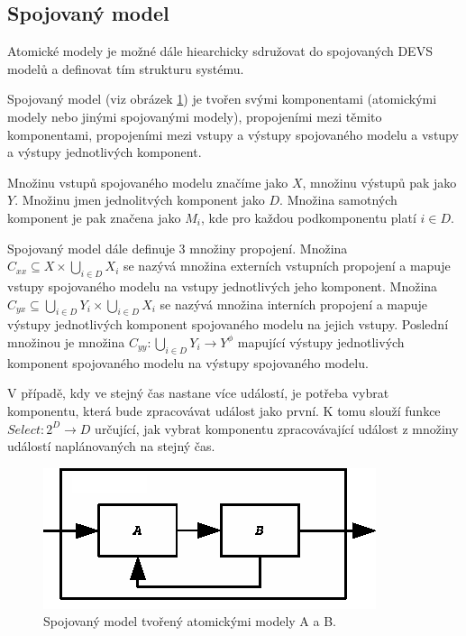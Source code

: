 \subsection{Spojovaný model}

Atomické modely je možné dále hiearchicky sdružovat do spojovaných DEVS modelů a definovat tím strukturu systému.

Spojovaný model (viz obrázek \ref{fig:coupled}) je tvořen svými komponentami (atomickými modely nebo jinými spojovanými modely), propojeními mezi těmito komponentami, propojeními mezi vstupy a výstupy spojovaného modelu a vstupy a výstupy jednotlivých komponent. 

Množinu vstupů spojovaného modelu značíme jako $X$, množinu výstupů pak jako $Y$. Množinu jmen jednolitvých komponent jako $D$. Množina samotných komponent je pak značena jako $M_i$, kde pro každou podkomponentu platí $i \in D$.

Spojovaný model dále definuje 3 množiny propojení. Množina $C_{xx}\subseteq X \times \bigcup_{i \in D} X_i$ se nazývá množina externích vstupních propojení a mapuje vstupy spojovaného modelu na vstupy jednotlivých jeho komponent. Množina $C_{yx}\subseteq \bigcup_{i \in D} Y_i \times \bigcup_{i \in D} X_i$ se nazývá množina interních propojení a mapuje výstupy jednotlivých komponent spojovaného modelu na jejich vstupy. Poslední množinou je množina $C_{yy}: \bigcup_{i \in D} Y_i \rightarrow Y^\phi$ mapující výstupy jednotlivých komponent spojovaného modelu na výstupy spojovaného modelu.

V případě, kdy ve stejný čas nastane více událostí, je potřeba vybrat komponentu, která bude zpracovávat událost jako první. K tomu slouží funkce $Select:2^D \rightarrow D$ určující, jak vybrat komponentu zpracovávající událost z množiny událostí naplánovaných na stejný čas.

\begin{figure}[ht]
\centering
\includegraphics[trim=0cm 0cm 0cm 0cm, scale=0.7]{fig/coupled}
\caption{Spojovaný model tvořený atomickými modely A a B.}
\label{fig:coupled}
\end{figure}

